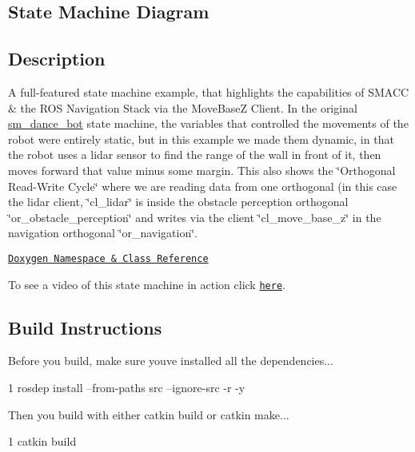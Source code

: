 \subsection*{State Machine Diagram}



\subsection*{Description}

A full-\/featured state machine example, that highlights the capabilities of S\+M\+A\+CC \& the R\+OS Navigation Stack via the Move\+BaseZ Client. In the original \hyperlink{namespacesm__dance__bot}{sm\+\_\+dance\+\_\+bot} state machine, the variables that controlled the movements of the robot were entirely static, but in this example we made them dynamic, in that the robot uses a lidar sensor to find the range of the wall in front of it, then moves forward that value minus some margin. This also shows the \char`\"{}\+Orthogonal Read-\/\+Write Cycle\char`\"{} where we are reading data from one orthogonal (in this case the lidar client, \char`\"{}cl\+\_\+lidar\char`\"{} is inside the obstacle perception orthogonal \char`\"{}or\+\_\+obstacle\+\_\+perception\char`\"{} and writes via the client \char`\"{}cl\+\_\+move\+\_\+base\+\_\+z\char`\"{} in the navigation orthogonal \char`\"{}or\+\_\+navigation\char`\"{}.~\newline


\href{https://reelrbtx.github.io/SMACC_Documentation/master/html/namespacesm__dance__bot__strikes__back.html}{\tt Doxygen Namespace \& Class Reference}

To see a video of this state machine in action click \href{https://www.youtube.com/watch?v=ucMr5Dg6UpU}{\tt here}.

\subsection*{Build Instructions}

Before you build, make sure you\textquotesingle{}ve installed all the dependencies...


\begin{DoxyCode}
1 rosdep install --from-paths src --ignore-src -r -y 
\end{DoxyCode}


Then you build with either catkin build or catkin make...


\begin{DoxyCode}
1 catkin build
\end{DoxyCode}

